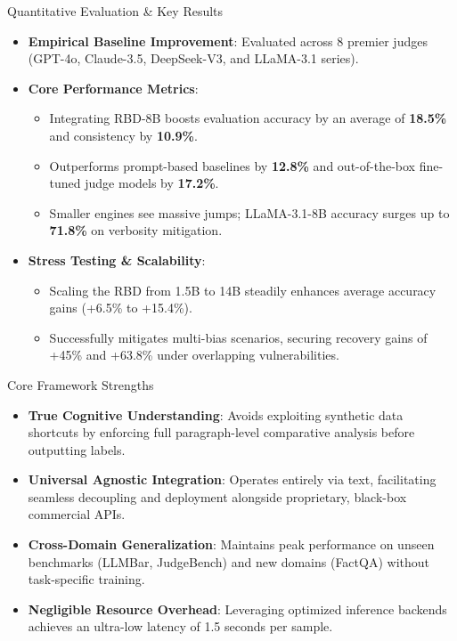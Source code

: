 \documentclass[10pt]{beamer}
\begin{document}
\begin{frame}{Quantitative Evaluation \& Key Results}
  \begin{itemize}
    \item \textbf{Empirical Baseline Improvement}: Evaluated across 8 premier judges (GPT-4o, Claude-3.5, DeepSeek-V3, and LLaMA-3.1 series).
    \item \textbf{Core Performance Metrics}:
      \begin{itemize}
        \item Integrating RBD-8B boosts evaluation accuracy by an average of \textbf{18.5\%} and consistency by \textbf{10.9\%}.
        \item Outperforms prompt-based baselines by \textbf{12.8\%} and out-of-the-box fine-tuned judge models by \textbf{17.2\%}.
        \item Smaller engines see massive jumps; LLaMA-3.1-8B accuracy surges up to \textbf{71.8\%} on verbosity mitigation.
      \end{itemize}
    \item \textbf{Stress Testing \& Scalability}:
      \begin{itemize}
        \item Scaling the RBD from 1.5B to 14B steadily enhances average accuracy gains (+6.5\% to +15.4\%).
        \item Successfully mitigates multi-bias scenarios, securing recovery gains of +45\% and +63.8\% under overlapping vulnerabilities.
      \end{itemize}
  \end{itemize}
\end{frame}

\begin{frame}{Core Framework Strengths}
  \begin{itemize}
    \item \textbf{True Cognitive Understanding}: Avoids exploiting synthetic data shortcuts by enforcing full paragraph-level comparative analysis before outputting labels.
    \item \textbf{Universal Agnostic Integration}: Operates entirely via text, facilitating seamless decoupling and deployment alongside proprietary, black-box commercial APIs.
    \item \textbf{Cross-Domain Generalization}: Maintains peak performance on unseen benchmarks (LLMBar, JudgeBench) and new domains (FactQA) without task-specific training.
    \item \textbf{Negligible Resource Overhead}: Leveraging optimized inference backends achieves an ultra-low latency of 1.5 seconds per sample.
  \end{itemize}
\end{frame}
\end{document}
